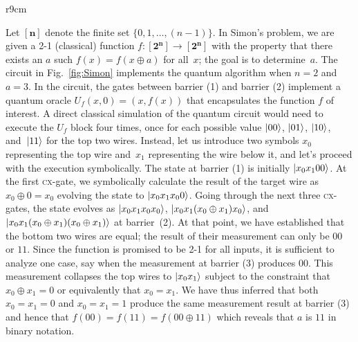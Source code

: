 \documentclass{article}
\newcommand{\cx}{\textsc{cx}}
\newcommand{\finset}[1]{[\mathbf{#1}]}
\begin{document}
\begin{refsection}
\begin{wrapfigure}{r}{9cm}
\caption{\label{fig:Simon}Circuit for Simon's Algorithm $n=2$ and $a=3$}
\end{wrapfigure}
Let $\finset{n}$ denote the finite set $\{ 0,1,\ldots,(n-1)\}$. In
Simon's problem, we are given a 2-1 (classical) function $f :
\finset{2^n} \rightarrow \finset{2^n}$ with the property that there
exists an $a$ such $f(x) = f(x \oplus a)$ for all~$x$; the goal is to
determine~$a$. The circuit in Fig.~\ref{fig:Simon} implements the
quantum algorithm when $n=2$ and $a = 3$. In the circuit, the gates
between barrier (1) and barrier (2) implement a quantum oracle
$U_f(x,0) = (x,f(x))$ that encapsulates the function $f$ of
interest. A direct classical simulation of the quantum circuit would
need to execute the $U_f$ block four times, once for each possible value
$\ket{00}$, $\ket{01}$, $\ket{10}$, and~$\ket{11}$ for the top two
wires. Instead, let us introduce two symbols $x_0$ representing the
top wire and~$x_1$ representing the wire below it, and let's proceed
with the execution symbolically. The state at barrier (1) is initially
$\ket{x_0x_100}$. At the first \cx-gate, we symbolically calculate the
result of the target wire as $x_0 \oplus 0 = x_0$ evolving the state
to $\ket{x_0x_1x_00}$. Going through the next three \cx-gates, the
state evolves as $\ket{x_0x_1x_0x_0}$, $\ket{x_0x_1(x_0\oplus
  x_1)x_0}$, and $\ket{x_0x_1(x_0\oplus x_1)(x_0\oplus x_1)}$ at
barrier~(2). At that point, we have established that the bottom two
wires are equal; the result of their measurement can only be $00$ or
$11$. Since the function is promised to be 2-1 for all inputs, it is
sufficient to analyze one case, say when the measurement at barrier
(3) produces $00$. This measurement collapses the top wires to
$\ket{x_0x_1}$ subject to the constraint that $x_0\oplus x_1 = 0$ or
equivalently that $x_0 = x_1$.  We have thus inferred that both
$x_0=x_1=0$ and $x_0=x_1=1$ produce the same measurement result at
barrier (3) and hence that $f(00) = f(11) = f(00 \oplus 11)$ which
reveals that $a$ is $11$ in binary notation.


\end{refsection}
\end{document}
